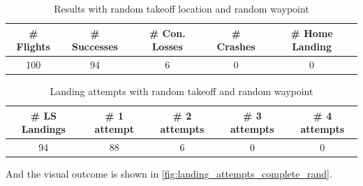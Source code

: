     \begin{table}[h]
        \begin{center}
         \caption{Results with random takeoff location and random waypoint}\vspace{1ex}
         \label{tab:result_complete_rand}
         \begin{tabular}{|c|c|c|c|c|}
         \hline
         \# Flights & \# Successes & \# Con. Losses & \# Crashes & \# Home Landing\\ \hline \hline
         100 & 94 & 6 & 0 & 0 \\
         \hline
         \end{tabular}
        \end{center}
    \end{table}
    \begin{table}[h]
        \begin{center}
         \caption{Landing attempts with random takeoff and random waypoint}\vspace{1ex}
         \label{tab:land_nums_complete_rand}
         \begin{tabular}{|c|c|c|c|c|}
         \hline
         \# LS Landings & \# 1 attempt & \# 2 attempts & \# 3 attempts & \# 4 attempts\\ \hline \hline
         94 & 88 & 6 & 0 & 0 \\
         \hline
         \end{tabular}
        \end{center}
    \end{table}

    And the visual outcome is shown in \cref{fig:landing_attempts_complete_rand}.

